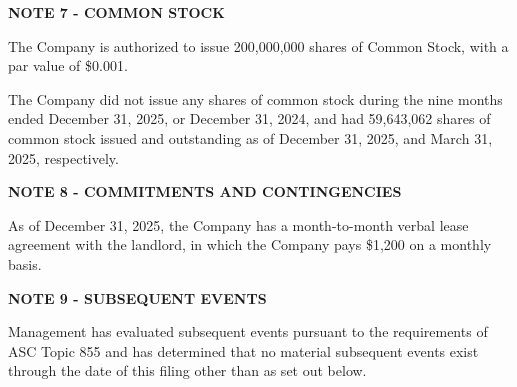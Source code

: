 \documentclass[11pt,a4paper]{article}
\begin{document}
\textbf{NOTE 7 - COMMON STOCK}

The Company is authorized to issue 200,000,000 shares of Common Stock, with a par value of \$0.001.

The Company did not issue any shares of common stock during the nine months ended December 31, 2025, or December 31, 2024, and had 59,643,062 shares of common stock issued and outstanding as of December 31, 2025, and March 31, 2025, respectively.

\textbf{NOTE 8 - COMMITMENTS AND CONTINGENCIES}

As of December 31, 2025, the Company has a month-to-month verbal lease agreement with the landlord, in which the Company pays \$1,200 on a monthly basis.

\textbf{NOTE 9 - SUBSEQUENT EVENTS}

Management has evaluated subsequent events pursuant to the requirements of ASC Topic 855 and has determined that no material subsequent events exist through the date of this filing other than as set out below.
\end{document}
